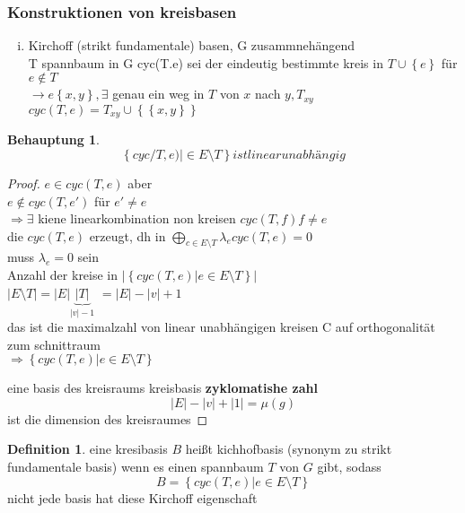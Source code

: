 \documentclass[a4paper]{article}
\newtheorem{behauptung}{Behauptung}
\theoremstyle{definition}
\newtheorem*{definition}{Definition}
\theoremstyle{remark}
\begin{document}
\subsubsection{Konstruktionen von kreisbasen}
\label{ssub:konstruktionen_von_kreisbasen}

\begin{enumerate}[(i)]
  \item Kirchoff (strikt fundamentale) basen, G zusammnehängend\\
    T spannbaum in G 
    cyc(T.e)  sei der eindeutig bestimmte kreis in $T\cup \left\{ e \right\}$ für $e\notin T$\\
    $\rightarrow e\left\{ x,y \right\}, \exists$ genau ein weg in $T$ von $x$ nach $y, T_{xy}$\\
    $cyc (T,e) = T_{xy}\cup \left\{ \left\{ x,y \right\} \right\}$




\end{enumerate}

\begin{behauptung}
  \begin{equation*}
  \left\{ cyc/T,e)|\in E\setminus T \right\}
  ist linear unabhängig
  \end{equation*}
\end{behauptung}
\begin{proof}
  $e\in cyc(T,e)$ aber \\
  $e\notin cyc(T,e')$ für $e'\neq e$\\
  $\Rightarrow \exists$ kiene linearkombination non kreisen $cyc(T,f)  f\neq e$\\ 
  die $cyc(T,e)$ erzeugt, dh in $\bigoplus _{c \in E \setminus T} \lambda_e cyc (T,e)=0$\\
  muss $\lambda _e=0$ sein \\
  Anzahl der kreise in $|\left\{ cyc(T,e) | e\in E\setminus T \right\}|$\\
  $|E\setminus T | = |E| \underbrace{|T|}_{|v|-1}$
  $=|E|-|v|+1$\\
  das ist die maximalzahl von linear unabhängigen kreisen C auf orthogonalität zum schnittraum \\
  $\Rightarrow\left\{ cyc(T,e)| e\in E\setminus T \right\}$

eine basis des kreisraums kreisbasis 
\textbf{zyklomatishe zahl} 
\begin{equation*}
  |E|-|v|+|1|= \mu(g)
\end{equation*}
ist die dimension des kreisraumes

\end{proof}
\begin{definition}
  eine kresibasis $B$ heißt kichhofbasis (synonym zu strikt fundamentale basis) wenn es einen spannbaum $T$ von $G$ gibt, sodass 
  \begin{equation*}
    B= \left\{ cyc(T,e)|e\in E\setminus T \right\}
  \end{equation*} 
  nicht jede basis hat diese Kirchoff eigenschaft
\end{definition}
\end{document}
